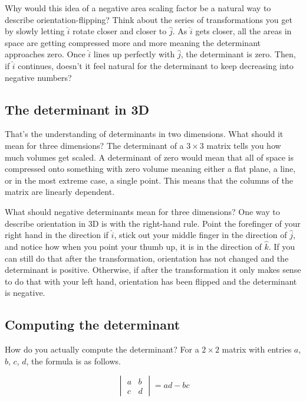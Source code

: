 Why would this idea of a negative area scaling factor be a natural way to
describe orientation-flipping? Think about the series of transformations you get
by slowly letting $\hat{i}$ rotate closer and closer to $\hat{j}$. As $\hat{i}$
gets closer, all the areas in space are getting compressed more and more meaning
the determinant approaches zero. Once $\hat{i}$ lines up perfectly with
$\hat{j}$, the determinant is zero. Then, if $\hat{i}$ continues, doesn't it
feel natural for the determinant to keep decreasing into negative numbers?

\subsection{The determinant in 3D}

That's the understanding of determinants in two dimensions. What should it mean
for three dimensions? The determinant of a $3 \times 3$ matrix tells you how
much volumes get scaled. A determinant of zero would mean that all of space is
compressed onto something with zero volume meaning either a flat plane, a line,
or in the most extreme case, a single point. This means that the columns of the
matrix are linearly dependent.

What should negative determinants mean for three dimensions? One way to describe
orientation in 3D is with the right-hand rule. Point the forefinger of your
right hand in the direction if $\hat{i}$, stick out your middle finger in the
direction of $\hat{j}$, and notice how when you point your thumb up, it is in
the direction of $\hat{k}$. If you can still do that after the transformation,
orientation has not changed and the determinant is positive. Otherwise, if after
the transformation it only makes sense to do that with your left hand,
orientation has been flipped and the determinant is negative.

\subsection{Computing the determinant}

How do you actually compute the determinant? For a $2 \times 2$ matrix with
entries $a$, $b$, $c$, $d$, the formula is as follows.

\begin{equation*}
  \begin{vmatrix}
    a & b \\
    c & d
  \end{vmatrix} = ad - bc
\end{equation*}

